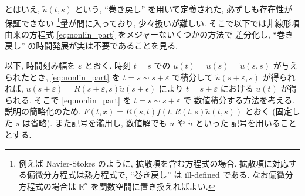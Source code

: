 \documentclass[12pt, a4j]{jsarticle}
\newcommand{\R}{\mathbb{R}}
\newcommand{\e}{\varepsilon}
\begin{document}
とはいえ, $\tilde{u}(t, s)$ という,
``巻き戻し'' を用いて定義された,
必ずしも存在性が保証できない
\footnote{例えば Navier-Stokes のように, 拡散項を含む方程式の場合. 拡散項に対応する偏微分方程式は熱方程式で, ``巻き戻し'' は ill-defined である. なお偏微分方程式の場合は $\R^{n}$ を関数空間に置き換えればよい.}量が間に入っており,
少々扱いが難しい. そこで以下では非線形項由来の方程式
\eqref{eq:nonlin_part} をメジャーないくつかの方法で
差分化し, ``巻き戻し'' の時間発展が実は不要であることを見る. \par

以下, 時間刻み幅を $\e$ とおく.
時刻 $t = s$ での $u(t) = u(s) = \tilde{u}(s, s)$
が与えられたとき, \eqref{eq:nonlin_part} を
$t = s \sim s + \e$ で積分して $\tilde{u}(s + \e, s)$
が得られれば, $u(s + \e) = R(s + \e, s) \tilde{u}(s + \epsilon)$
により $t = s + \e$ における $u(t)$ が得られる.
そこで \eqref{eq:nonlin_part} を $t = s \sim s + \e$ で
数値積分する方法を考える. 説明の簡略化のため,
$F(t, x) = R(s, t) f(t, R(t, s) \tilde{u}(t, s))$
とおく (固定した $s$ は省略).
また記号を濫用し, 数値解でも $u$ や $\tilde{u}$ といった
記号を用いることとする.
\end{document}

